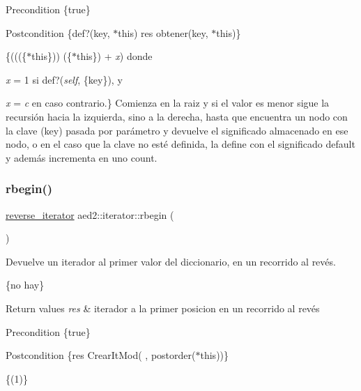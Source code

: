 \begin{DoxyPrecond}{Precondition}
\{true\} 
\end{DoxyPrecond}
\begin{DoxyPostcond}{Postcondition}
\{def?(key, $\ast$this)  res  obtener(key, $\ast$this)\}
\end{DoxyPostcond}
\{(((\{$\ast$this\}))  (\{$\ast$this\}) + {\itshape x}) donde
\begin{DoxyItemize}
\item {\itshape x} = 1 si def?({\itshape self}, \{key\}), y
\item {\itshape x} = {\itshape c} en caso contrario.\} Comienza en la raiz y si el valor es menor sigue la recursión hacia la izquierda, sino a la derecha, hasta que encuentra un nodo con la clave (key) pasada por parámetro y devuelve el significado almacenado en ese nodo, o en el caso que la clave no esté definida, la define con el significado default y además incrementa en uno count. 
\end{DoxyItemize}\mbox{\label{classaed2_1_1iterator_a296638725dce2fc10316d18563eb3131}} 
\subsubsection{\texorpdfstring{rbegin()}{rbegin()}\hspace{0.1cm}{\footnotesize\ttfamily [1/2]}}
{\footnotesize\ttfamily \hyperlink{classaed2_1_1iterator_a07b2c0fa31611e03cd019b290acd6d80}{reverse\+\_\+iterator} aed2\+::iterator\+::rbegin (\begin{DoxyParamCaption}{ }\end{DoxyParamCaption})\hspace{0.3cm}{\ttfamily [inline]}}



Devuelve un iterador al primer valor del diccionario, en un recorrido al revés. 

\{no hay\}


\begin{DoxyRetVals}{Return values}
{\em res} & iterador a la primer posicion en un recorrido al revés\\
\hline
\end{DoxyRetVals}
\begin{DoxyPrecond}{Precondition}
\{true\} 
\end{DoxyPrecond}
\begin{DoxyPostcond}{Postcondition}
\{res  Crear\+It\+Mod(  , postorder($\ast$this))\}
\end{DoxyPostcond}
\{(1)\}

